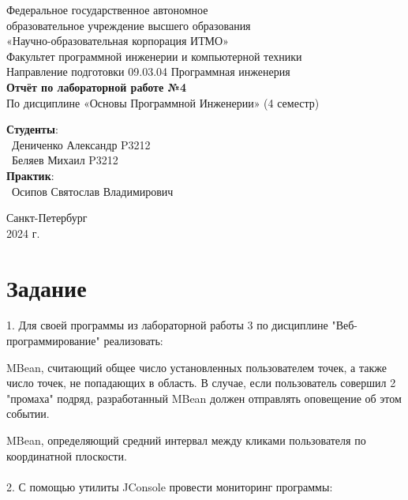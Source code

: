 \documentclass{article}
\begin{document}
\begin{center}
    \Large
    Федеральное государственное автономное \\
    образовательное учреждение высшего образования \\ 
    «Научно-образовательная корпорация ИТМО»\\
    \vspace{0.5cm}
    \large
    Факультет программной инженерии и компьютерной техники \\
    Направление подготовки 09.03.04 Программная инженерия \\
    \vspace{1cm}
    \Large
    \textbf{Отчёт по лабораторной работе №4} \\
    По дисциплине «Основы Программной Инженерии» (4 семестр)\\
    \large
    \vspace{8cm}

    \begin{minipage}{.33\textwidth}
    \end{minipage}
    \hfill
    \begin{minipage}{.4\textwidth}
    
        \textbf{Студенты}: \vspace{.1cm} \\
        \ Дениченко Александр P3212\\
        \ Беляев Михаил P3212\\
        \textbf{Практик}:  \\
        \ Осипов Святослав Владимирович
    \end{minipage}
    \vfill
Санкт-Петербург\\ 2024 г.
\end{center}
\pagestyle{empty}
\newpage
\pagestyle{plain}
\section{Задание}
1. Для своей программы из лабораторной работы 3 по дисциплине "Веб-программирование" реализовать:

MBean, считающий общее число установленных пользователем точек, а также число точек, не попадающих в область. В случае, если пользователь совершил 2 "промаха" подряд, разработанный MBean должен отправлять оповещение об этом событии.

MBean, определяющий средний интервал между кликами пользователя по координатной плоскости.
\\ \\
2. С помощью утилиты JConsole провести мониторинг программы:
\end{document}

